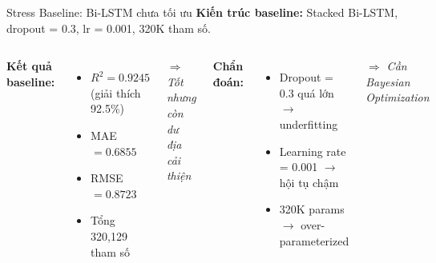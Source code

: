 \documentclass[11pt]{beamer}
\begin{document}
\begin{frame}{Stress Baseline: Bi-LSTM chưa tối ưu}
\small
\textbf{Kiến trúc baseline:} Stacked Bi-LSTM, dropout = 0.3, lr = 0.001, 320K tham số.

\vspace{0.1cm}
\begin{columns}[T]
\textbf{Kết quả baseline:}
\begin{itemize}
    \item $R^2 = 0.9245$ (giải thích 92.5\%)
    \item MAE $= 0.6855$
    \item RMSE $= 0.8723$
    \item Tổng 320,129 tham số
\end{itemize}
$\Rightarrow$ \textit{Tốt nhưng còn dư địa cải thiện}

\textbf{Chẩn đoán:}
\begin{itemize}
    \item Dropout = 0.3 quá lớn $\rightarrow$ underfitting
    \item Learning rate = 0.001 $\rightarrow$ hội tụ chậm
    \item 320K params $\rightarrow$ over-parameterized
\end{itemize}
$\Rightarrow$ \textit{Cần Bayesian Optimization}
\end{columns}

\vspace{0.1cm}
\end{frame}
\end{document}
